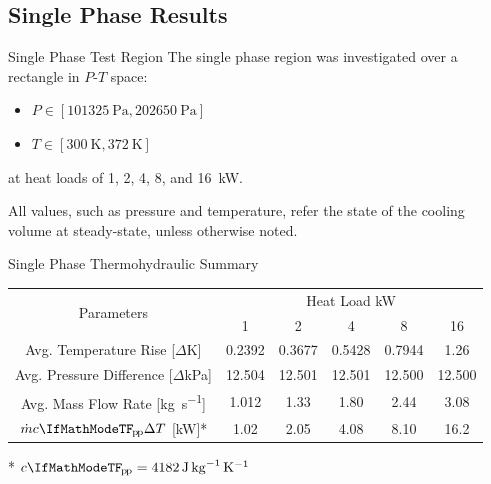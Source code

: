 \documentclass[10pt,t,xcolor=table,compress]{UWMadBeamer}
\begin{document}
  
    
    \subsection*{Single Phase Results}
    \begin{frame}{Single Phase Test Region}
        The single phase region was investigated over a rectangle in $P$-$T$ space:
        \begin{itemize}
            \item $P \in [\SI{101325}{\pascal},\SI{202650}{\pascal}]$
            \item $T \in [\SI{300}{\kelvin},\SI{372}{\kelvin}]$
        \end{itemize}
        at heat loads of \num{1}, \num{2}, \num{4}, \num{8}, and \SI{16}{\kW}.
        
        All values, such as pressure and temperature, refer the state of the cooling volume at steady-state, unless otherwise noted.
    \end{frame}
    \begin{frame}{Single Phase Thermohydraulic Summary}
        \begin{table}%
            \centering
            \begin{tabular}{cccccc}
                \toprule
                    \multirow{2}{*}{Parameters}                     & \multicolumn{5}{c}{Heat Load \si{\kW}} \\[0.1em]\cline{2-6}
                                                                    &    \num{1}     & \num{2}       & \num{4}      & \num{8}     & \num{16}     \\\midrule
                Avg. Temperature Rise    [$\Delta$\si{\kelvin}]       & \num{0.2392}   & \num{0.3677}  & \num{0.5428} & \num{0.7944}& \num{1.26}   \\[0.5em]
                Avg. Pressure Difference [$\Delta$\si{\kilo\pascal}]  & \num{12.504}   & \num{12.501}  & \num{12.501} & \num{12.500}& \num{12.500} \\[0.5em]
                Avg. Mass Flow Rate      [\si{\kg\per\second}]      & \num{1.012}    & \num{1.33}    & \num{1.80}   & \num{2.44}  & \num{3.08}   \\[0.5em]
                $\dot{m}c\subs{p}\Delta{T}$ [\si{\kW}]*             & \num{1.02}     & \num{2.05}    & \num{4.08}   & \num{8.10}  & \num{16.2}   \\
                \bottomrule
            \end{tabular}
            \vskip0pt
            * $c\subs{p} = \SI{4182}{\joule\per\kg\per\kelvin}$
        \end{table}
    \end{frame}
\end{document}
